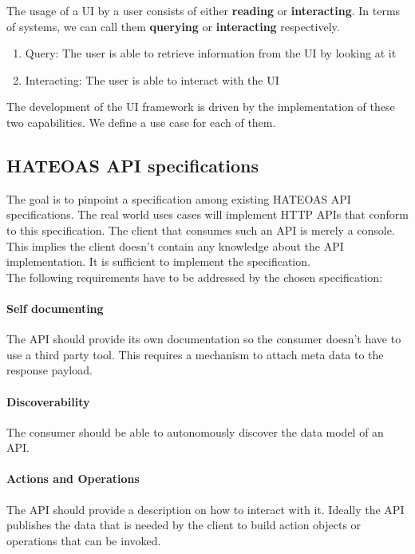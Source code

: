 The usage of a UI by a user consists of either \textbf{reading} or \textbf{interacting}. In terms of systems, we can call them \textbf{querying} or \textbf{interacting} respectively.

\begin{enumerate}
  \item Query: The user is able to retrieve information from the UI by looking at it
  \item Interacting: The user is able to interact with the UI
\end{enumerate}

The development of the UI framework is driven by the implementation of these two capabilities. We define a use case for each of them.

\subsection{HATEOAS API specifications}
The goal is to pinpoint a specification among existing HATEOAS API specifications. The real world uses cases will implement HTTP APIs that conform to this specification. The client that consumes such an API is merely a console. This implies the client doesn't contain any knowledge about the API implementation. It is sufficient to implement the specification. \\
The following requirements have to be addressed by the chosen specification:

\paragraph{Self documenting}
The API should provide its own documentation so the consumer doesn't have to use a third party tool. This requires a mechanism to attach meta data to the response payload.

\paragraph{Discoverability}
The consumer should be able to autonomously discover the data model of an API.

\paragraph{Actions and Operations}
The API should provide a description on how to interact with it. Ideally the API publishes the data that is needed by the client to build action objects or operations that can be invoked.

